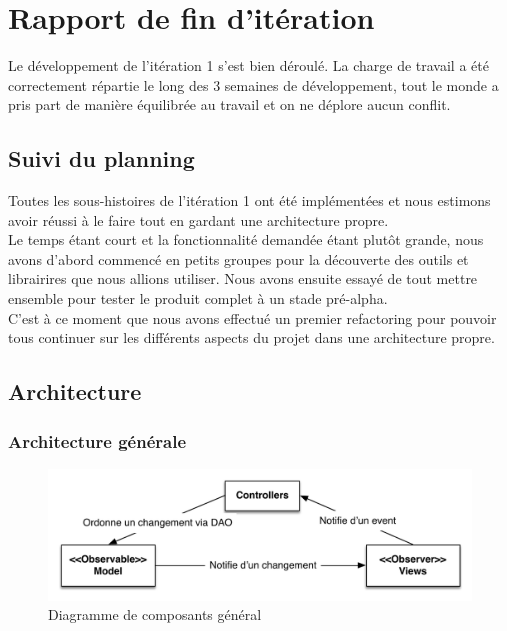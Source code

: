 \section{Rapport de fin d'itération}

Le développement de l'itération 1 s'est bien déroulé. La charge de travail a 
été correctement répartie le long des 3 semaines de développement, tout le monde
a pris part de manière équilibrée au travail et on ne déplore aucun conflit.\\

\subsection{Suivi du planning}

Toutes les sous-histoires de l'itération 1 ont été implémentées et nous estimons
avoir réussi à le faire tout en gardant une architecture propre.\\

Le temps étant court et la fonctionnalité demandée étant plutôt grande, nous 
avons d'abord commencé en petits groupes pour la découverte des outils et
librairires que nous allions utiliser. Nous avons ensuite essayé de tout mettre
ensemble pour tester le produit complet à un stade pré-alpha.\\

C'est à ce moment que nous avons effectué un premier refactoring pour pouvoir
tous continuer sur les différents aspects du projet dans une architecture propre.

\subsection{Architecture}

	\subsubsection{Architecture générale}
	\begin{figure}[h]
		\includegraphics[width=\textwidth]{uml/general-architecture.pdf}
		\caption{\label{fig:overall:components} Diagramme de composants général}
	\end{figure}

